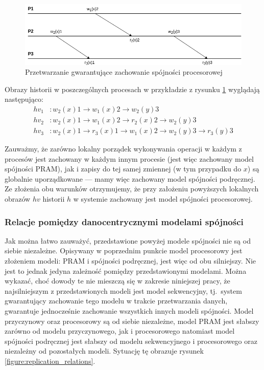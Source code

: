 \begin{figure}
    \includegraphics[width=\linewidth]{images/02-cpu.png}
    \caption{Przetwarzanie gwarantujące zachowanie spójności procesorowej}
    \label{figure:replication_cpu}
\end{figure}

Obrazy historii w poszczególnych procesach w przykładzie z rysunku \ref{figure:replication_cpu} wyglądają następująco:
\begin{align*}
    hv_1&: w_2(x)1 \rightarrow w_1(x)2 \rightarrow w_2(y)3 \\
    hv_2&: w_2(x)1 \rightarrow w_1(x)2 \rightarrow r_2(x)2 \rightarrow w_2(y)3 \\
    hv_3&: w_2(x)1 \rightarrow r_3(x)1 \rightarrow w_1(x)2 \rightarrow w_2(y)3 \rightarrow r_3(y)3
\end{align*}

Zauważmy, że zarówno lokalny porządek wykonywania operacji w każdym z procesów jest zachowany w każdym innym procesie (jest więc zachowany model spójności PRAM), jak i zapisy do tej samej zmiennej (w tym przypadku do $ x $) są globalnie uporządkowane --- mamy więc zachowany model spójności podręcznej. Ze złożenia obu warunków otrzymujemy, że przy założeniu powyższych lokalnych obrazów $ hv $ historii $ h $ w systemie zachowany jest model spójności procesorowej.

\subsubsection{Relacje pomiędzy danocentrycznymi modelami spójności}

Jak można łatwo zauważyć, przedstawione powyżej modele spójności nie są od siebie niezależne.
Opisywany w poprzednim punkcie model procesorowy jest złożeniem modeli: PRAM i spójności podręcznej,
jest więc od obu silniejszy. Nie jest to jednak jedyna zależność pomiędzy przedstawionymi modelami.
Można wykazać, choć dowody te nie mieszczą się w zakresie niniejszej pracy, że najsilniejszym z
przedstawionych modeli jest model sekwencyjny, tj.\ system gwarantujący zachowanie tego modelu w trakcie przetwarzania danych, gwarantuje jednocześnie zachowanie wszystkich innych modeli spójności. Model przyczynowy oraz procesorowy są od siebie niezależne, model PRAM jest słabszy zarówno od modelu przyczynowego, jak i procesorowego natomiast model spójności podręcznej jest słabszy od modelu sekwencyjnego i procesorowego oraz niezależny od pozostałych modeli. Sytuację tę obrazuje rysunek \ref{figure:replication_relations}.

